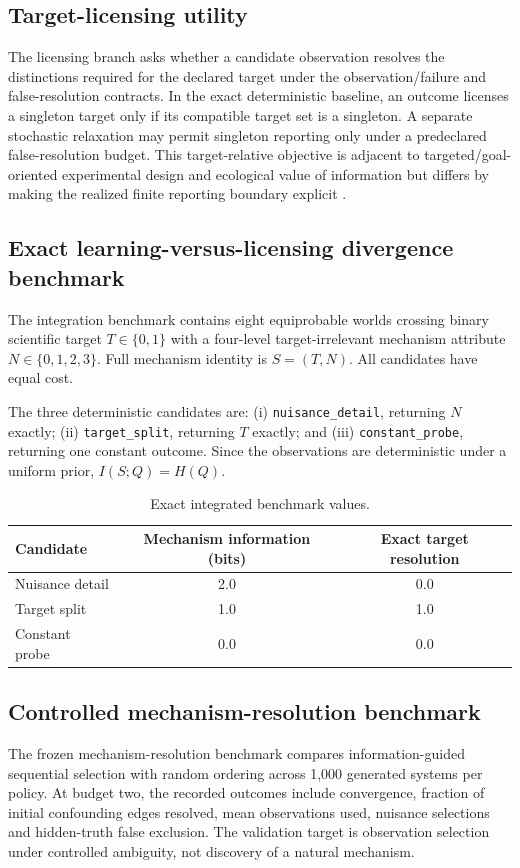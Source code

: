 \documentclass[11pt]{article}
\begin{document}
\subsection{Target-licensing utility}
The licensing branch asks whether a candidate observation resolves the distinctions required for the declared target under the observation/failure and false-resolution contracts. In the exact deterministic baseline, an outcome licenses a singleton target only if its compatible target set is a singleton. A separate stochastic relaxation may permit singleton reporting only under a predeclared false-resolution budget. This target-relative objective is adjacent to targeted/goal-oriented experimental design and ecological value of information but differs by making the realized finite reporting boundary explicit \cite{ChalonerVerdinelli1995,VanlierEtAl2012,AttiaEtAl2018,ZhongEtAl2026,CanessaEtAl2015}.

\subsection{Exact learning-versus-licensing divergence benchmark}
The integration benchmark contains eight equiprobable worlds crossing binary scientific target $T\in\{0,1\}$ with a four-level target-irrelevant mechanism attribute $N\in\{0,1,2,3\}$. Full mechanism identity is $S=(T,N)$. All candidates have equal cost.

The three deterministic candidates are: (i) \texttt{nuisance\_detail}, returning $N$ exactly; (ii) \texttt{target\_split}, returning $T$ exactly; and (iii) \texttt{constant\_probe}, returning one constant outcome. Since the observations are deterministic under a uniform prior, $I(S;Q)=H(Q)$.

\begin{table}[ht]
\centering
\caption{Exact integrated benchmark values.}
\begin{tabular}{lcc}
\toprule
Candidate & Mechanism information (bits) & Exact target resolution \\
\midrule
Nuisance detail & 2.0 & 0.0 \\
Target split & 1.0 & 1.0 \\
Constant probe & 0.0 & 0.0 \\
\bottomrule
\end{tabular}
\end{table}

\subsection{Controlled mechanism-resolution benchmark}
The frozen mechanism-resolution benchmark compares information-guided sequential selection with random ordering across 1,000 generated systems per policy. At budget two, the recorded outcomes include convergence, fraction of initial confounding edges resolved, mean observations used, nuisance selections and hidden-truth false exclusion. The validation target is observation selection under controlled ambiguity, not discovery of a natural mechanism.
\end{document}
